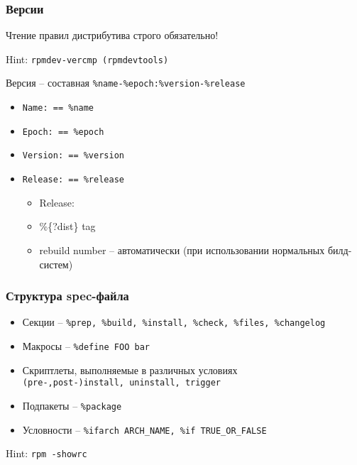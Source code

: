 \begin{frame}
	\frametitle{Версии}

	\Large{Чтение правил дистрибутива строго обязательно!}
	
	Hint: {\tt rpmdev-vercmp (rpmdevtools)}
	\begin{block}{ Версия -- составная}
		{\tt \%name-\%epoch:\%version-\%release}
		\begin{itemize}
			\item {\tt Name: == \%name}
			\item {\tt Epoch: == \%epoch}
			\item {\tt Version: == \%version}
			\item {\tt Release: == \%release}
			\begin{itemize}
				\item Release:
				\item \%\{?dist\} tag
				\item rebuild number -- автоматически (при использовании нормальных билд-систем)
			\end{itemize}
		\end{itemize}
	\end{block}

\end{frame}

\begin{frame}
	\frametitle{Структура spec-файла}

	\begin{itemize}
		\item Секции --  {\tt \%prep, \%build, \%install, \%check, \%files, \%changelog} 
		\item Макросы -- {\tt \%define FOO bar} 
		\item Скриптлеты, выполняемые в различных условиях\\
			{\tt (pre-,post-)install, uninstall, trigger}
		\item Подпакеты -- {\tt \%package}
		\item Условности -- {\tt \%ifarch ARCH\_NAME, \%if TRUE\_OR\_FALSE}
	\end{itemize}
	\begin{block}{Hint:}
		 {\tt rpm -\-showrc }
	\end{block}
\end{frame}



